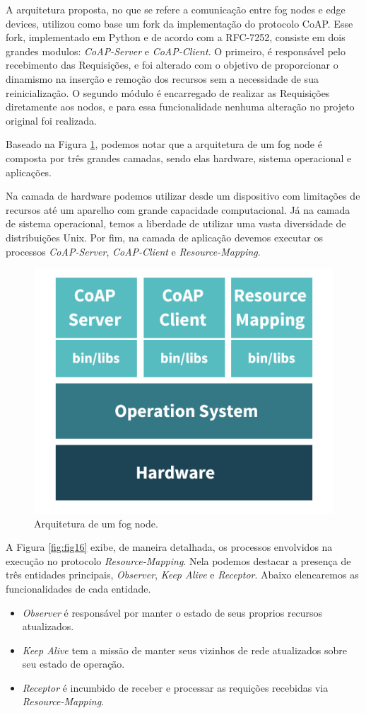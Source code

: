 A arquitetura proposta, no que se refere a comunicação entre fog nodes e edge devices, utilizou como base um fork da implementação do protocolo CoAP\cite{coapimpl:2018}.
Esse fork, implementado em Python e de acordo com a RFC-7252, consiste em dois grandes modulos: \textit{CoAP-Server} e \textit{CoAP-Client}.
O primeiro, é responsável pelo recebimento das Requisições, e foi alterado com o objetivo de proporcionar o dinamismo na inserção e remoção dos recursos sem a necessidade de sua reinicialização.
O segundo módulo é encarregado de realizar as Requisições diretamente aos nodos, e para essa funcionalidade nenhuma alteração no projeto original foi realizada.


Baseado na Figura \ref{fig:fig15}, podemos notar que a arquitetura de um fog node é composta por três grandes camadas, sendo elas hardware, sistema operacional e aplicações.

Na camada de hardware podemos utilizar desde um dispositivo com limitações de recursos até um aparelho com grande capacidade computacional.
Já na camada de sistema operacional, temos a liberdade de utilizar uma vasta diversidade de distribuições Unix.
Por fim, na camada de aplicação devemos executar os processos \textit{CoAP-Server}, \textit{CoAP-Client} e \textit{Resource-Mapping}.

\begin{figure}[H]
    \centering\includegraphics[width=.5\textwidth]{fig15.png}
    \caption%
    {\label{fig:fig15} Arquitetura de um fog node.}
\end{figure}

A Figura \ref{fig:fig16} exibe, de maneira detalhada, os processos envolvidos na execução no protocolo \textit{Resource-Mapping}.
Nela podemos destacar a presença de três entidades principais, \textit{Observer}, \textit{Keep Alive} e \textit{Receptor}.
Abaixo elencaremos as funcionalidades de cada entidade.

\begin{itemize}
    \item \textit{Observer} é responsável por manter o estado de seus proprios recursos atualizados.
    \item \textit{Keep Alive} tem a missão de manter seus vizinhos de rede atualizados sobre seu estado de operação.
    \item \textit{Receptor} é incumbido de receber e processar as requições recebidas via \textit{Resource-Mapping}.
\end{itemize}

